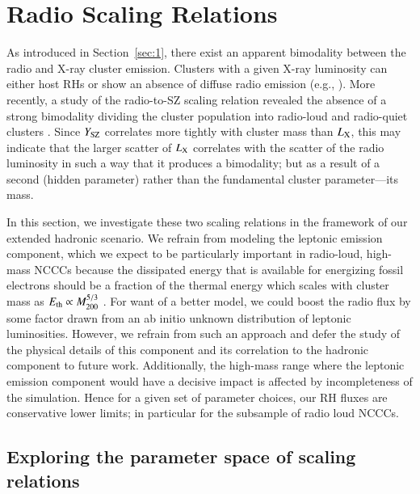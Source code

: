 \documentclass[useAMS,usenatbib]{mn2e}
\begin{document}
\section{Radio Scaling Relations}
\label{sec:4}
As introduced in Section~\ref{sec:1}, there exist an apparent bimodality between
the radio and X-ray cluster emission. Clusters with a given X-ray luminosity can
either host RHs or show an absence of diffuse radio emission (e.g.,
\citealp{2009A&A...507..661B,2011A&A...527A..99E}). More recently, a study of
the radio-to-SZ scaling relation revealed the absence of a strong bimodality
dividing the cluster population into radio-loud and radio-quiet clusters
\citep{2012MNRAS.421L.112B}. Since $Y_{{\mathrm{SZ}}}$ correlates more tightly with
cluster mass than $L_{{\mathrm{X}}}$, this may indicate that the larger scatter of
$L_{{\mathrm{X}}}$ correlates with the scatter of the radio luminosity in such a way
that it produces a bimodality; but as a result of a second (hidden parameter)
rather than the fundamental cluster parameter---its mass. 

In this section, we investigate these two scaling relations in the framework of
our extended hadronic scenario. We refrain from modeling the leptonic emission
component, which we expect to be particularly important in radio-loud, high-mass
NCCCs because the dissipated energy that is available for energizing fossil
electrons should be a fraction of the thermal energy which scales with cluster
mass as $E_{\mathrm{th}}\propto M_{200}^{5/3}$ \citep[][for magneto-turbulent
reacceleration models]{2005MNRAS.357.1313C}. For want of a better model, we
could boost the radio flux by some factor drawn from an ab initio unknown
distribution of leptonic luminosities. However, we refrain from such an approach
and defer the study of the physical details of this component and its
correlation to the hadronic component to future work. Additionally, the high-mass 
range where the leptonic emission component would have a decisive impact 
is affected by incompleteness of the simulation. Hence for a given set of
parameter choices, our RH fluxes are conservative lower limits; in
particular for the subsample of radio loud NCCCs.


\subsection{Exploring the parameter space of scaling relations}
\end{document}
